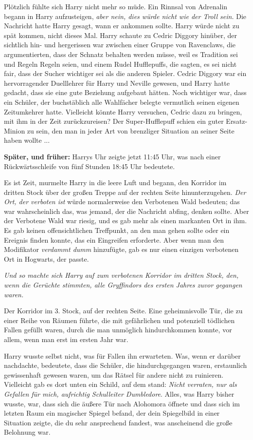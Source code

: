 Plötzlich fühlte sich Harry nicht mehr so müde. Ein Rinnsal von Adrenalin begann
in Harry aufzusteigen,\emph{ aber nein, dies würde nicht wie der Troll sein.}
Die Nachricht hatte Harry gesagt, wann er ankommen sollte. Harry würde nicht zu
spät kommen, nicht dieses Mal. Harry schaute zu Cedric Diggory hinüber, der
sichtlich hin- und hergerissen war zwischen einer Gruppe von Ravenclaws, die
argumentierten, dass der Schnatz behalten werden müsse, weil es Tradition sei
und Regeln Regeln seien, und einem Rudel Hufflepuffs, die sagten, es sei nicht
fair, dass der Sucher wichtiger sei als die anderen Spieler. Cedric Diggory war
ein hervorragender Duelllehrer für Harry und Neville gewesen, und Harry hatte
gedacht, dass sie eine gute Beziehung aufgebaut hätten. Noch wichtiger war, dass
ein Schüler, der buchstäblich alle Wahlfächer belegte vermutlich seinen eigenen
Zeitumkehrer hatte. Vielleicht könnte Harry versuchen, Cedric dazu zu bringen,
mit ihm in der Zeit zurückzureisen? Der Super-Hufflepuff schien ein guter
Ersatz-Minion zu sein, den man in jeder Art von brenzliger Situation an seiner
Seite haben wollte ...

\textbf{Später, und früher:}
Harrys Uhr zeigte jetzt 11:45 Uhr, was nach einer Rückwärtsschleife von fünf
Stunden 18:45 Uhr bedeutete.

\glqq{}Es ist Zeit\grqq{}, murmelte Harry in die leere Luft und begann, den
Korridor im dritten Stock über der großen Treppe auf der rechten Seite
hinunterzugehen. \emph{Der Ort, der verboten ist} würde normalerweise den
Verbotenen Wald bedeuten; das war wahrscheinlich das, was jemand, der die
Nachricht abfing, denken sollte. Aber der Verbotene Wald war riesig, und es gab
mehr als einen markanten Ort in ihm. Es gab keinen offensichtlichen Treffpunkt,
an den man gehen sollte oder ein Ereignis finden konnte, das ein Eingreifen
erforderte. Aber wenn man den Modifikator \glqq{}\emph{verdammt dumm\grqq{}}
hinzufügte, gab es nur einen einzigen verbotenen Ort in Hogwarts, der passte.

\emph{Und so machte sich Harry auf zum verbotenen Korridor im dritten Stock,
den, wenn die Gerüchte stimmten, alle Gryffindors des ersten Jahres zuvor
gegangen waren.}

Der Korridor im 3. Stock, auf der rechten Seite. Eine geheimnisvolle Tür, die zu
einer Reihe von Räumen führte, die mit gefährlichen und potenziell tödlichen
Fallen gefüllt waren, durch die man unmöglich hindurchkommen konnte, vor allem,
wenn man erst im ersten Jahr war.

Harry wusste selbst nicht, was für Fallen ihn erwarteten. Was, wenn er darüber
nachdachte, bedeutete, dass die Schüler, die hindurchgegangen waren, erstaunlich
gewissenhaft gewesen waren, um das Rätsel für andere nicht zu ruinieren.
Vielleicht gab es dort unten ein Schild, auf dem stand: \glqq{}\emph{Nicht
verraten, nur als Gefallen für mich, aufrichtig Schulleiter Dumbledore}\grqq{}.
Alles, was Harry bisher wusste, war, dass sich die äußere Tür nach Alohomora
öffnete und dass sich im letzten Raum ein magischer Spiegel befand, der dein
Spiegelbild in einer Situation zeigte, die du sehr ansprechend fandest, was
anscheinend die große Belohnung war.

